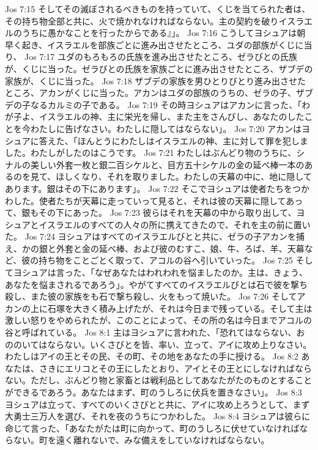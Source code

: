 Jos 7:15  そしてその滅ぼされるべきものを持っていて、くじを当てられた者は、その持ち物全部と共に、火で焼かれなければならない。主の契約を破りイスラエルのうちに愚かなことを行ったからである』」。
Jos 7:16  こうしてヨシュアは朝早く起き、イスラエルを部族ごとに進み出させたところ、ユダの部族がくじに当り、
Jos 7:17  ユダのもろもろの氏族を進み出させたところ、ゼラびとの氏族が、くじに当った。ゼラびとの氏族を家族ごとに進み出させたところ、ザブデの家族が、くじに当った。
Jos 7:18  ザブデの家族を男ひとりびとり進み出させたところ、アカンがくじに当った。アカンはユダの部族のうちの、ゼラの子、ザブデの子なるカルミの子である。
Jos 7:19  その時ヨシュアはアカンに言った、「わが子よ、イスラエルの神、主に栄光を帰し、また主をさんびし、あなたのしたことを今わたしに告げなさい。わたしに隠してはならない」。
Jos 7:20  アカンはヨシュアに答えた、「ほんとうにわたしはイスラエルの神、主に対して罪を犯しました。わたしがしたのはこうです。
Jos 7:21  わたしはぶんどり物のうちに、シナルの美しい外套一枚と銀二百シケルと、目方五十シケルの金の延べ棒一本のあるのを見て、ほしくなり、それを取りました。わたしの天幕の中に、地に隠してあります。銀はその下にあります」。
Jos 7:22  そこでヨシュアは使者たちをつかわした。使者たちが天幕に走っていって見ると、それは彼の天幕に隠してあって、銀もその下にあった。
Jos 7:23  彼らはそれを天幕の中から取り出して、ヨシュアとイスラエルのすべての人々の所に携えてきたので、それを主の前に置いた。
Jos 7:24  ヨシュアはすべてのイスラエルびとと共に、ゼラの子アカンを捕え、かの銀と外套と金の延べ棒、および彼のむすこ、娘、牛、ろば、羊、天幕など、彼の持ち物をことごとく取って、アコルの谷へ引いていった。
Jos 7:25  そしてヨシュアは言った、「なぜあなたはわれわれを悩ましたのか。主は、きょう、あなたを悩まされるであろう」。やがてすべてのイスラエルびとは石で彼を撃ち殺し、また彼の家族をも石で撃ち殺し、火をもって焼いた。
Jos 7:26  そしてアカンの上に石塚を大きく積み上げたが、それは今日まで残っている。そして主は激しい怒りをやめられたが、このことによって、その所の名は今日までアコルの谷と呼ばれている。
Jos 8:1  主はヨシュアに言われた、「恐れてはならない、おののいてはならない。いくさびとを皆、率い、立って、アイに攻め上りなさい。わたしはアイの王とその民、その町、その地をあなたの手に授ける。
Jos 8:2  あなたは、さきにエリコとその王にしたとおり、アイとその王とにしなければならない。ただし、ぶんどり物と家畜とは戦利品としてあなたがたのものとすることができるであろう。あなたはまず、町のうしろに伏兵を置きなさい」。
Jos 8:3  ヨシュアは立って、すべてのいくさびとと共に、アイに攻め上ろうとして、まず大勇士三万人を選び、それを夜のうちにつかわした。
Jos 8:4  ヨシュアは彼らに命じて言った、「あなたがたは町に向かって、町のうしろに伏せていなければならない。町を遠く離れないで、みな備えをしていなければならない。
